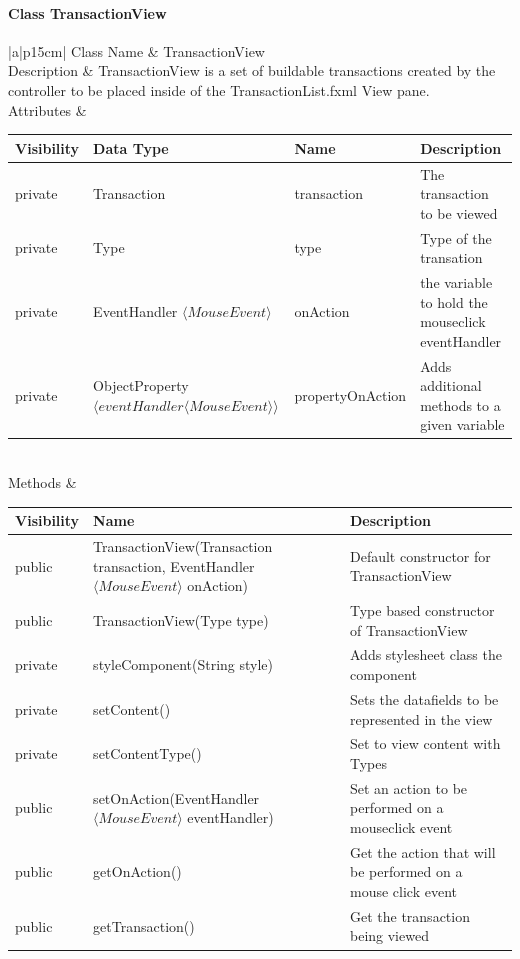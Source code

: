\documentclass[12pt]{article}
\begin{document}
\paragraph{Class TransactionView}
\begin{table}[H]
	\begin{tabular}{|a|p{15cm}|}
		\hline
		{Class Name} & {TransactionView} \\
		\hline
		Description & TransactionView is a set of buildable transactions created by the controller to be placed inside of the TransactionList.fxml View pane.\\
		\hline
		Attributes & 
		\begin{tabular}{| p{1.5cm} | p{5.5cm} | p{3.0cm} | p{3.45cm} |}
			\hline
			\rowcolor{lightgray}
			Visibility & Data Type & Name & Description \\
			\hline
			\rowcolor{white}
			private & Transaction & transaction & The transaction to be viewed\\
			\hline
			private & Type & type & Type of the transation\\
			\hline		
			private & EventHandler $\langle MouseEvent \rangle$ & onAction & the variable to hold the mouseclick eventHandler\\
			\hline	
			private & ObjectProperty $\langle eventHandler \langle MouseEvent \rangle \rangle$ & propertyOnAction & Adds additional methods to a given variable  \\
			\hline	
		\end{tabular} \\
		\hline
		Methods & 		 
		\begin{tabular}{| p{2cm} | p{5cm} | p{6.9cm} |}
			\hline
			\rowcolor{gray}
			{Visibility} &{Name} & {Description} \\
			\hline
			\rowcolor{white}			
			public & TransactionView(Transaction transaction, EventHandler $\langle MouseEvent \rangle$ onAction) & Default constructor for TransactionView\\
			\hline
			public & TransactionView(Type type) & Type based constructor of TransactionView\\
			\hline	
			private & styleComponent(String style) & Adds stylesheet class the component\\
			\hline	
			private & setContent() & Sets the datafields to be represented in the view\\
			\hline	
			private & setContentType() & Set to view content with Types\\
			\hline
			public & setOnAction(EventHandler $\langle MouseEvent \rangle$ eventHandler) & Set an action to be performed on a mouseclick event\\
			\hline
			public & getOnAction() & Get the action that will be performed on a mouse click event\\
			\hline
			public & getTransaction() & Get the transaction being viewed\\
		\end{tabular}								 
	\end{tabular}
\end{table}
\end{document}
